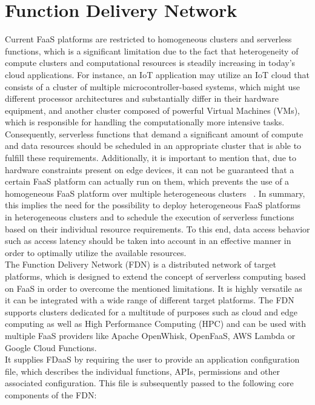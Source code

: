 \section{Function Delivery Network}
Current FaaS platforms are restricted to homogeneous clusters and serverless functions, which is a significant limitation due to the fact that heterogeneity of compute clusters and computational resources is steadily increasing in today's cloud applications. For instance, an IoT application may utilize an IoT cloud that consists of a cluster of multiple microcontroller-based systems, which might use different processor architectures and substantially differ in their hardware equipment, and another cluster composed of powerful Virtual Machines (VMs), which is responsible for handling the computationally more intensive tasks. Consequently, serverless functions that demand a significant amount of compute and data resources should be scheduled in an appropriate cluster that is able to fulfill these requirements. Additionally, it is important to mention that, due to hardware constraints present on edge devices, it can not be guaranteed that a certain FaaS platform can actually run on them, which prevents the use of a homogeneous FaaS platform over multiple heterogeneous clusters ~\parencite{fdn}.
In summary, this implies the need for the possibility to deploy heterogeneous FaaS platforms in heterogeneous clusters and to schedule the execution of serverless functions based on their individual resource requirements. To this end, data access behavior such as access latency should be taken into account in an effective manner in order to optimally utilize the available resources.
\\
The Function Delivery Network (FDN) is a distributed network of target platforms, which is designed to extend the concept of serverless computing based on FaaS in order to overcome the mentioned limitations. It is highly versatile as it can be integrated with a wide range of different target platforms. The FDN supports clusters dedicated for a multitude of purposes such as cloud and edge computing as well as High Performance Computing (HPC) and can be used with multiple FaaS providers like Apache OpenWhisk, OpenFaaS, AWS Lambda or Google Cloud Functions.\\
It supplies FDaaS by requiring the user to provide an application configuration file, which describes the individual functions, APIs, permissions and other associated configuration. This file is subsequently passed to the following core components of the FDN:

